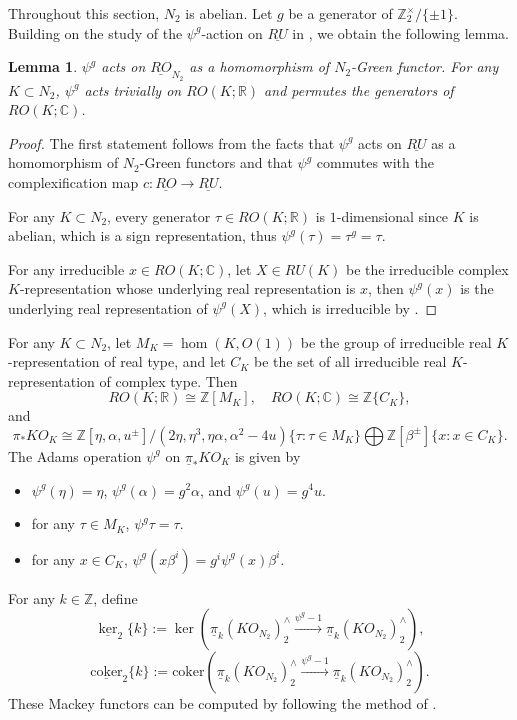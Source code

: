 \documentclass{amsart}
\theoremstyle{plain}
\newtheorem{lemma}[theorem]{Lemma}
\theoremstyle{definition}
\theoremstyle{remark}
\begin{document}
Throughout this section, $N_2$ is abelian. Let $g$ be a generator of $\mathbb{Z}_2^\times/\{\pm 1\}$. Building on the study of the $\psi^g$-action on $\underline{RU}$ in \cite{carawan2023homotopy}, we obtain the following lemma.
\begin{lemma}\label{lem: the action of psi on RO}
$\psi^g$ acts on $\underline{RO}_{N_2}$ as a homomorphism of $N_2$-Green functor. For any $K\subset N_2$, $\psi^g$ acts trivially on $RO(K;\mathbb{R})$ and permutes the generators of $RO(K;\mathbb{C})$. 
\end{lemma}
\begin{proof}
    The first statement follows from the facts that $\psi^g$ acts on $\underline{RU}$ as a homomorphism of $N_2$-Green functors \cite[Lemma 3.2]{carawan2023homotopy} and that $\psi^g$ commutes with the complexification map $c\colon \underline{RO}\to \underline{RU}$.

    For any $K\subset N_2$, every generator $\tau\in RO(K;\mathbb{R})$ is $1$-dimensional since $K$ is abelian, which is a sign representation, thus $\psi^g(\tau)=\tau^g=\tau$.

    For any irreducible $x\in RO(K;\mathbb{C})$, let $X\in RU(K)$ be the irreducible complex $K$-representation whose underlying real representation is $x$, then $\psi^g(x)$ is the underlying real representation of $\psi^g(X)$, which is irreducible by \cite[Lemma 3.1]{carawan2023homotopy}.
\end{proof}

For any $K\subset N_2$, let 
$M_K=\hom(K,O(1))$
be the group of irreducible real $K$-representation of real type, and let $C_K$ be the set of all irreducible real $K$-representation of complex type.
Then 
\[ RO(K;\mathbb{R})\cong \mathbb{Z}[M_K],\quad RO(K;\mathbb{C})\cong \mathbb{Z}\{C_K\},\]
and 
\[
\pi_* KO_{K} \cong \mathbb{Z}[\eta,\alpha,u^{\pm}]/(2\eta, \eta^3, \eta\alpha, \alpha^2-4u)\{\tau:\tau\in M_K\}\bigoplus \mathbb{Z}[\beta^{\pm}]\{x:x\in C_K\}.
\]
The Adams operation $\psi^g$ on $\underline{\pi}_* KO_{K}$ is given by 
\begin{itemize}
    \item[(1)] $\psi^g(\eta)=\eta$, $\psi^g(\alpha)=g^2\alpha$, and $\psi^g(u)=g^4u$.
	\item[(2)] for any $\tau\in M_K$, $\psi^g \tau=\tau$.
	\item[(3)] for any $x\in C_K$, $\psi^g(x\beta^i)=g^i\psi^g(x)\beta^i$.
\end{itemize}
For any $k\in \mathbb{Z}$, define
    \[\underline{\ker}_2\{k\}:=\ker(\underline{\pi}_k(KO_{N_2})_2^{\wedge}\overset{\psi^g-1}{\longrightarrow}\underline{\pi}_k (KO_{N_2})_2^{\wedge}),\]
    \[ \underline{\mathrm{coker}}_2\{k\}:=\mathrm{coker}(\underline{\pi}_k (KO_{N_2})_2^{\wedge}\overset{\psi^g-1}{\longrightarrow}\underline{\pi}_k (KO_{N_2})_2^{\wedge}).\]
These Mackey functors can be computed by following the method of \cite[Proposition 3.7]{carawan2023homotopy}.  
\end{document}
